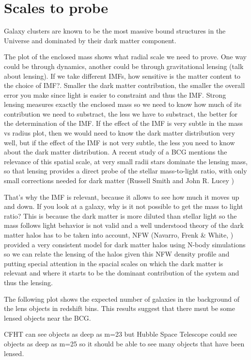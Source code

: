 \chapter{Scales to probe}

Galaxy clusters are known to be the most massive bound structures in the Universe and dominated by their dark matter component.

The plot of the enclosed mass shows what radial scale we need to prove. One way could be through dynamics, another could be through gravitational lensing (talk about lensing). If we take different IMFs, how sensitive is the matter content to the choice of IMF?. Smaller the dark matter contribution, the smaller the overall error you make since light is easier to constraint and thus the IMF. Strong lensing measures exactly the enclosed mass so we need to know how much of its contribution we need to substract, the less we have to substract, the better for the determination of the IMF. If the effect of the IMF is very subtle in the mass vs radius plot, then we would need to know the dark matter distribution very well, but if the effect of the IMF is not very subtle, the less you need to know about the dark matter distribution. A recent study of a BCG mentions the relevance of this spatial scale, at very small radii stars dominate the lensing mass, so that lensing provides a direct probe of the stellar mass-to-light ratio, with only small corrections needed for dark matter (Russell Smith and John R. Lucey \citeyear{Reference7}) 

That's why the IMF is relevant, because it allows to see how much it moves up and down. If you look at a galaxy, why is it not possible to get the mass to light ratio? This is because the dark matter is more diluted than stellar light so the mass follows light behavior is not valid and a well understood theory of the dark matter halos has to be taken into account, NFW (Navarro, Frenk \& White, \citeyear{Reference17}) provided a very consistent model for dark matter halos using N-body simulations so we can relate the lensing of the halos given this NFW density profile and putting special attention in the spacial scales on which the dark matter is relevant and where it starts to be the dominant contribution of the system and thus the lensing.

The following plot shows the expected number of galaxies in the background of the lens objects in redshift bins. This results suggest that there msut be some lensed objects near the BCG.

CFHT can see objects as deep as m=23 but Hubble Space Telescope could see objects as deep as m=25 so it should be able to see many objects that have been lensed.

